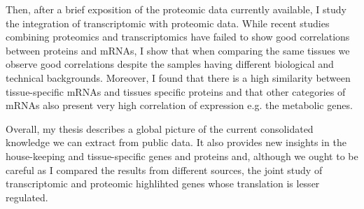 \begin{singlespace}
\begin{small}
    Then, after a brief exposition of the proteomic data currently available, I
    study the integration of transcriptomic with proteomic data. While recent
    studies combining proteomics and transcriptomics have failed to show good
    correlations between proteins and mRNAs, I show that when comparing the
    same tissues we observe good correlations despite the samples having
    different biological and technical backgrounds. Moreover, I found that there
    is a high similarity between tissue-specific mRNAs and tissues specific
    proteins and that other categories of mRNAs also present very high
    correlation of expression e.g. the metabolic genes.


    Overall, my thesis describes a global picture of the current consolidated
    knowledge we can extract from public data. It also provides new insights in
    the house-keeping and tissue-specific genes and proteins and, although we
    ought to be careful as I compared the results from different sources, the
    joint study of transcriptomic and proteomic highlihted genes whose
    translation is lesser regulated.

    \end{small}
\end{singlespace}

